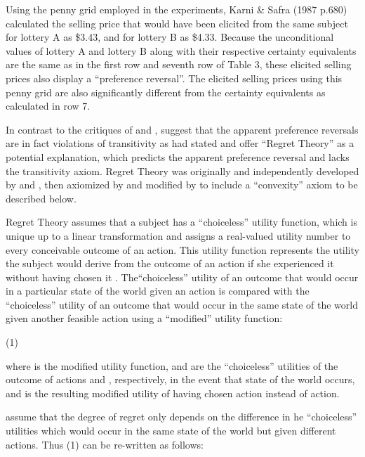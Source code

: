 Using the penny grid employed in the \textcite{Grether1979} experiments, Karni \& Safra (1987 p.680)⁠ calculated the selling price that would have been elicited from the same subject for lottery A as \$3.43, and for lottery B as \$4.33.
Because the unconditional values of lottery A and lottery B along with their respective certainty equivalents are the same as in the first row and seventh row of Table 3, these elicited selling prices also display a \enquote{preference reversal}.
The elicited selling prices using this penny grid are also significantly different from the certainty equivalents as calculated in row 7.

In contrast to the critiques of \textcite{Holt1986} and \textcite{Karni1987}, \textcite{Loomes1989} suggest that the apparent preference reversals are in fact violations of transitivity as \textcite[623]{Grether1979} had stated and offer \enquote{Regret Theory} as a potential explanation, which predicts the apparent preference reversal and lacks the transitivity axiom.
Regret Theory was originally and independently developed by \textcite{Loomes1982} and \textcite{Bell1982}, then axiomized by \textcite{Fishburn1987} and modified by \textcite{Loomes1987} to include a \enquote{convexity} axiom to be described below.


Regret Theory assumes that a subject has a \enquote{choiceless} utility function, which is unique up to a linear transformation and assigns a real-valued utility number to every conceivable outcome of an action.
This utility function represents the utility the subject would derive from the outcome of an action if she experienced it without having chosen it \textcite[807]{Loomes1987}.
The\enquote{choiceless} utility of an outcome that would occur in a particular state of the world given an action is compared with the \enquote{choiceless} utility of an outcome that would occur in the same state of the world given another feasible action using a \enquote{modified} utility function:

(1)	

where  is the modified utility function,  and  are the \enquote{choiceless} utilities of the outcome of actions  and , respectively, in the event that state of the world  occurs, and  is the resulting modified utility of having chosen action  instead of action. 

\textcite[809]{Loomes1987} assume that the degree of regret only depends on the difference in  he \enquote{choiceless} utilities which would occur in the same state of the world but given different actions.
Thus (1) can be re-written as follows:

